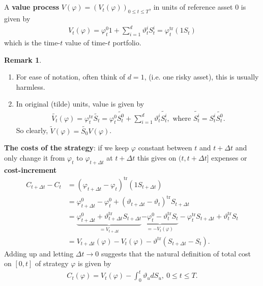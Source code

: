\documentclass[12pt,a4paper, twoside]{article}
\theoremstyle{definition}
\newtheorem{rem}{Remark}[section]
\begin{document}
\\\\
A \textbf{value process} $V(\varphi)= ( V_t( \varphi))_{0 \leq t \leq T}$, in units of reference asset $0$ is given by 
\begin{align*}
V_t( \varphi) = \varphi_t^0 1 + \sum_{i=1}^d \vartheta_t^i S_t^i = \varphi_t^{\text{tr}} (1S_t)
\end{align*}
which is the time-$t$ value of time-$t$ portfolio. 
\begin{rem} \
\begin{enumerate}
\item For ease of notation, often think of $d=1$, (i.e. one risky asset), this is usually harmless. 
\item In original (tilde) units, value is given by 
\begin{align*}
\widetilde{V_t}( \varphi)= \varphi_t^{\text{tr}} \widetilde{S_t} = \varphi_t^0 \widetilde{S_t^0} + \sum_{i=1}^d \vartheta_t^i \widetilde{S_t^i}, \text{ where }  \widetilde{S_t^i}= S_t^i \widetilde{S_t^0}.
\end{align*}
So clearly,  $\widetilde{V}(\varphi)= \widetilde{S_0}V( \varphi)$. 
\end{enumerate}
\end{rem}
\noindent \textbf{The costs of the strategy}: if we keep $\varphi$ constant between $t$ and $t + \Delta t$ and only change it from $\varphi_t$ to $\varphi_{t + \Delta t}$ at $t + \Delta t$ this gives on $(t,t+ \Delta t]$ expenses or \textbf{cost-increment} 
\begin{align*}
C_{t + \Delta t} - C_t &= ( \varphi_{t + \Delta t } - \varphi_t)^{\text{tr}} (1 S_{t + \Delta t}) \\
&= \varphi_{t + \Delta t}^0 - \varphi_t^0 + ( \vartheta_{t + \Delta t} - \vartheta_t)^{\text{tr}} S_{t + \Delta t }  \\
&= \underbrace{\varphi_{t + \Delta t}^0 + \vartheta_{t + \Delta t}^{\text{tr}} S_{t + \Delta t}}_{= V_{t + \Delta t}} \underbrace{- \varphi_t^0 - \vartheta_t^{\text{tr}} S_t}_{= - V_t( \varphi)}- \varphi_t^{\text{tr}} S_{t+ \Delta t} + \vartheta_t^{\text{tr}} S_t  \\ 
&= V_{t + \Delta t} ( \varphi) - V_t( \varphi) - \vartheta^{\text{tr}}( S_{t + \Delta t} - S_t). 
\end{align*}
Adding up and letting $\Delta t \to 0$ suggests that the natural definition of total cost on $[0,t]$ of strategy $\varphi$ is given by 
\begin{align*}
C_t( \varphi) = V_t( \varphi)- \int_0^t \vartheta_u d S_u, \ 0 \leq t \leq T. 
\end{align*}
\end{document}
